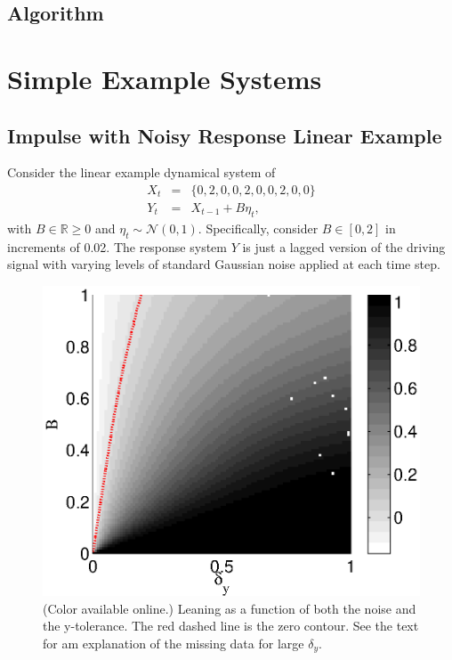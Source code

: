 \documentclass[a4paper,11pt,twocolumn]{article}
\begin{document}
\subsection{Algorithm}

\section{Simple Example Systems}

\subsection{Impulse with Noisy Response Linear Example}
Consider the linear example dynamical system of
\begin{eqnarray}
\label{eq:linearex1}
X_t &=& \{0,2,0,0,2,0,0,2,0,0\}\\
Y_t &=& X_{t-1}+B\eta_t,
\end{eqnarray}
with $B\in\mathbb{R}\ge 0$ and $\eta_t\sim\mathcal{N}\left(0,1\right)$.  Specifically, consider $B\in[0,2]$ in increments of 0.02.  The response system $Y$ is just a lagged version of the driving signal with varying levels of standard Gaussian noise applied at each time step.  
\begin{figure}[ht]
\includegraphics[scale=0.65]{SimpleIRexample_plot.eps}
\caption{(Color available online.) Leaning as a function of both the noise and the y-tolerance.  The red dashed line is the zero contour.  See the text for am explanation of the missing data for large $\delta_y$.}
\end{figure}
\end{document}
